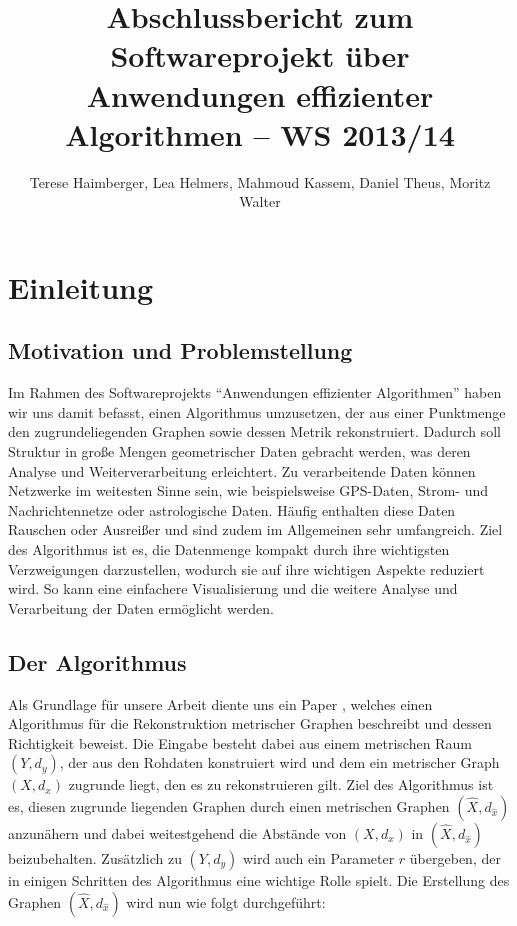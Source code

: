 \documentclass[parskip=half,
 fontsize=12pt, bibtotoc,
 titlepage, ngerman]
 {article}
\author{Terese Haimberger, Lea Helmers, Mahmoud Kassem, Daniel Theus, Moritz Walter}
\title{Abschlussbericht zum Softwareprojekt über Anwendungen effizienter Algorithmen -- WS 2013/14}
\date{}
\begin{document}

\newpage
\thispagestyle{empty}
\tableofcontents
\newpage
\onehalfspacing
\section{Einleitung}
\subsection{Motivation und Problemstellung}
Im Rahmen des Softwareprojekts "`Anwendungen effizienter Algorithmen"' haben wir uns damit befasst, einen Algorithmus umzusetzen, der aus einer Punktmenge den zugrundeliegenden Graphen sowie dessen Metrik rekonstruiert. Dadurch soll Struktur in gro{\ss}e Mengen geometrischer Daten gebracht werden, was deren Analyse und Weiterverarbeitung erleichtert. Zu verarbeitende Daten können Netzwerke im weitesten Sinne sein, wie beispielsweise GPS-Daten, Strom- und Nachrichtennetze oder astrologische Daten. Häufig enthalten diese Daten Rauschen oder Ausreißer und sind zudem im Allgemeinen sehr umfangreich. Ziel des Algorithmus ist es, die Datenmenge kompakt durch ihre wichtigsten Verzweigungen darzustellen, wodurch sie auf ihre wichtigen Aspekte reduziert wird. So kann eine einfachere Visualisierung und die weitere Analyse und Verarbeitung der Daten ermöglicht werden.
\subsection{Der Algorithmus}
Als Grundlage für unsere Arbeit diente uns ein Paper \cite{chenEa2012}, welches einen Algorithmus für die Rekonstruktion metrischer Graphen beschreibt und dessen Richtigkeit beweist. Die Eingabe besteht dabei aus einem metrischen Raum $\left(Y, d_y\right)$, der aus den Rohdaten konstruiert wird und dem ein metrischer Graph $\left(X, d_x\right)$ zugrunde liegt, den es zu rekonstruieren gilt. Ziel des Algorithmus ist es, diesen zugrunde liegenden Graphen durch einen metrischen Graphen $(\hat{X}, d_{\hat{x}})$ anzunähern und dabei weitestgehend die Abstände von $\left(X, d_x\right)$ in $(\hat{X}, d_{\hat{x}})$ beizubehalten. Zusätzlich zu $\left(Y, d_y\right)$ wird auch ein Parameter $r$ übergeben, der in einigen Schritten des Algorithmus eine wichtige Rolle spielt. Die Erstellung des Graphen $(\hat{X}, d_{\hat{x}})$ wird nun wie folgt durchgeführt:\newline
\end{document}
